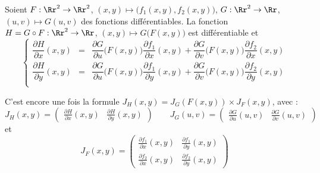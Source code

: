 \documentclass[12pt, class=report,crop=false]{standalone}
\begin{document}
%
%
%
%

\bigskip


\begin{proposition}
Soient $F : \Rr^2 \to \Rr^2$, $(x,y) \mapsto \big(f_1(x,y),f_2(x,y) \big)$, $G : \Rr^2 \to \Rr$,
$(u,v) \mapsto G(u,v)$ des fonctions différentiables.
La fonction $H = G \circ F : \Rr^2 \to \Rr$, $(x,y) \mapsto G \big( F(x,y) \big)$ est différentiable
et 
$$\left\{\begin{array}{rcl}
\dfrac{\partial H}{\partial x}(x,y) &=& 
\dfrac{\partial G}{\partial u}\big( F(x,y) \big) \dfrac{\partial f_1}{\partial x}(x,y)+
\dfrac{\partial G}{\partial v}\big( F(x,y) \big) \dfrac{\partial f_2}{\partial x}(x,y) \\[3ex]
\dfrac{\partial H}{\partial y}(x,y) &=& 
\dfrac{\partial G}{\partial u}\big( F(x,y) \big) \dfrac{\partial f_1}{\partial y}(x,y)+
\dfrac{\partial G}{\partial v}\big( F(x,y) \big) \dfrac{\partial f_2}{\partial y}(x,y) \\
\end{array}\right.
$$
\end{proposition}

C'est encore une fois la formule $J_H (x,y) = J_G ( F(x,y) ) \times J_F (x,y)$, avec :
$$
J_H(x,y) = \begin{pmatrix} \frac{\partial H}{\partial x}(x,y)
&  \frac{\partial H}{\partial y}(x,y) \end{pmatrix} \qquad
J_G(u,v) = \begin{pmatrix} \frac{\partial G}{\partial u}(u,v)
&  \frac{\partial G}{\partial v}(u,v) \end{pmatrix}$$
et 
$$
J_F(x,y) = \begin{pmatrix} 
\frac{\partial f_1}{\partial x}(x,y) &  \frac{\partial f_1}{\partial y}(x,y) \\
\frac{\partial f_2}{\partial x}(x,y) &  \frac{\partial f_2}{\partial y}(x,y) 
\end{pmatrix}
$$
\end{document}
